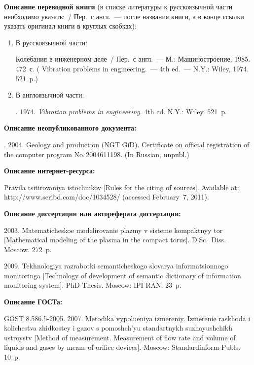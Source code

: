 {\begin{enumerate}[1.]
{\noindent
\textbf{Описание переводной книги}
(в списке литературы к русскоязычной части необходимо указать:~/ Пер.\ с англ.~--- 
после названия книги, а в конце ссылки указать оригинал книги в круглых скобках):
\begin{enumerate}[1.]
\item  В русскоязычной части:

\thispagestyle{empty}

Колебания в инженерном деле~/ Пер.\ с англ.~--- М.: Машиностроение, 1985. 472~с. 
( 
Vibration problems in engineering.~--- 4th ed.~--- N.Y.: Wiley, 1974. 521~p.) 
\item  В англоязычной части:

. 
1974. \textit{Vibration problems in engineering}. 4th ed. N.Y.: Wiley. 521~p. 
\end{enumerate}


\noindent
\textbf{Описание неопубликованного документа:}

. 
2004. Geology and production (NGT GiD). Certificate on official registration of the computer program 
No.\,2004611198. (In Russian, unpubl.)

\noindent
\textbf{Описание интернет-ресурса:}


Pravila tsitirovaniya istochnikov [Rules for the citing of sources]. Available at: {\sf 
http://www.scribd.com/doc/1034528/} (accessed February~7, 2011).


\noindent
\textbf{Описание диссертации или автореферата диссертации:}

2003. Matematicheskoe modelirovanie plazmy v sisteme kompaktnyy tor [Mathematical 
modeling of the plasma in the compact torus]. D.Sc.\ Diss. Moscow. 272~p.

 2009. Tekhnologiya razrabotki semanticheskogo 
slovarya informatsionnogo monitoringa [Technology of development of 
semantic dictionary of information monitoring system]. PhD Thesis. Moscow: IPI RAN. 23~p.


\noindent
\textbf{Описание ГОСТа:}

GOST 8.586.5-2005. 2007. Metodika vypolneniya izmereniy. Izmerenie raskhoda i kolichestva zhidkostey i gazov s 
pomoshch'yu standartnykh suzhayushchikh ustroystv [Method of measurement. 
Measurement of flow rate and volume of liquids and gases by means of orifice devices]. Moscow: 
Standardinform  Publs. 10~p.

}
\end{enumerate}}
